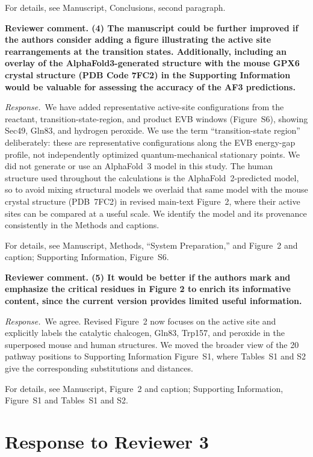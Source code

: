 \documentclass[11pt]{article}
\newcommand{\ReviewerComment}[1]{\par\noindent\textbf{Reviewer comment. #1}\par}
\newcommand{\AuthorResponse}{\par\noindent\textit{Response.}\ }
\newcommand{\Location}[1]{\par\noindent For details, see #1\par}
\begin{document}
\Location{Manuscript, Conclusions, second paragraph.}

\ReviewerComment{(4) The manuscript could be further improved if the authors consider adding a figure illustrating the active site rearrangements at the transition states. Additionally, including an overlay of the AlphaFold3-generated structure with the mouse GPX6 crystal structure (PDB Code 7FC2) in the Supporting Information would be valuable for assessing the accuracy of the AF3 predictions.}

\AuthorResponse We have added representative active-site configurations from the reactant,
transition-state-region, and product EVB windows (Figure~S6), showing Sec49, Gln83, and
hydrogen peroxide. We use the term ``transition-state region'' deliberately: these are
representative configurations along the EVB energy-gap profile, not independently
optimized quantum-mechanical stationary points. We did not generate or use an
AlphaFold~3 model in this study. The human structure used throughout the calculations is
the AlphaFold~2-predicted model, so to avoid mixing structural models we overlaid that
same model with the mouse crystal structure (PDB~7FC2) in revised main-text Figure~2,
where their active sites can be compared at a useful scale. We identify the model and its
provenance consistently in the Methods and captions.

\Location{Manuscript, Methods, ``System Preparation,'' and Figure~2 and caption;
Supporting Information, Figure~S6.}

\ReviewerComment{(5) It would be better if the authors mark and emphasize the critical residues in Figure 2 to enrich its informative content, since the current version provides limited useful information.}

\AuthorResponse We agree. Revised Figure~2 now focuses on the active site and explicitly
labels the catalytic chalcogen, Gln83, Trp157, and peroxide in the superposed mouse and
human structures. We moved the broader view of the 20 pathway positions to Supporting
Information Figure~S1, where Tables~S1 and S2 give the corresponding substitutions and
distances.

\Location{Manuscript, Figure~2 and caption; Supporting Information, Figure~S1 and Tables~S1 and S2.}

\newpage
\section*{Response to Reviewer 3}
\end{document}
